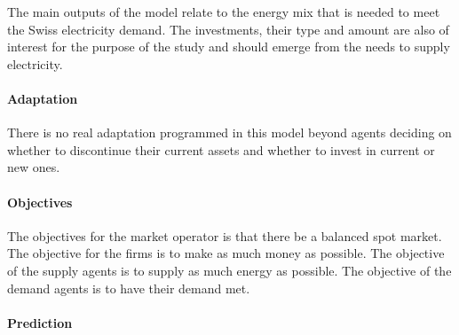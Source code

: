 The main outputs of the model relate to the energy mix that is needed to meet the Swiss electricity demand. The investments, their type and amount are also of interest for the purpose of the study and should emerge from the needs to supply electricity.

\paragraph{Adaptation}

There is no real adaptation programmed in this model beyond agents deciding on whether to discontinue their current assets and whether to invest in current or new ones.

\paragraph{Objectives}

The objectives for the market operator is that there be a balanced spot market. The objective for the firms is to make as much money as possible. The objective of the supply agents is to supply as much energy as possible. The objective of the demand agents is to have their demand met. 

\paragraph{Prediction}

